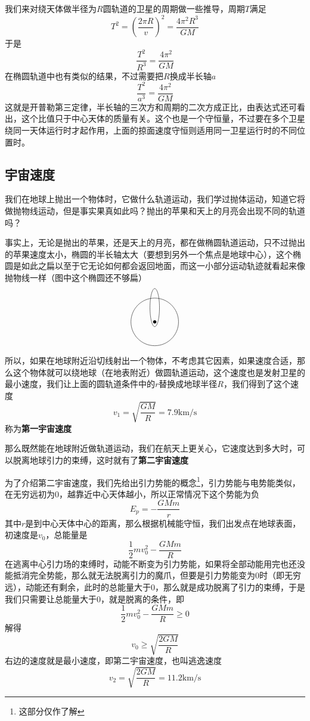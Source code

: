 \documentclass[hyperref,UTF8]{ctexart}
\begin{document}
我们来对绕天体做半径为$R$圆轨道的卫星的周期做一些推导，周期$T$满足
\[T^2 = (\frac{2\pi R}{v})^2=\frac{4\pi^2 R^3}{GM}\]
于是
\[\frac{T^2}{ R^3} = \frac{4\pi^2}{GM}\]
在椭圆轨道中也有类似的结果，不过需要把$R$换成半长轴$a$
\[\frac{T^2}{a^3} = \frac{4\pi^2}{GM}\]
这就是开普勒第三定律，半长轴的三次方和周期的二次方成正比，由表达式还可看出，这个比值只于中心天体的质量有关。这个也是一个守恒量，不过要在多个卫星绕同一天体运行时才起作用，上面的掠面速度守恒则适用同一卫星运行时的不同位置时。

\subsection{宇宙速度}
我们在地球上抛出一个物体时，它做什么轨道运动，我们学过抛体运动，知道它将做抛物线运动，但是事实果真如此吗？抛出的苹果和天上的月亮会出现不同的轨道吗？

事实上，无论是抛出的苹果，还是天上的月亮，都在做椭圆轨道运动，只不过抛出的苹果速度太小，椭圆的半长轴太大（要想到另外一个焦点是地球中心），这个椭圆是如此之扁以至于它无论如何都会返回地面，而这一小部分运动轨迹就看起来像抛物线一样（图中这个椭圆还不够扁）
\[
\begin{tikzpicture}
    \draw (0,0) circle (1cm);
    \draw (0,0.6) ellipse (0.2cm and 0.8cm);
    \fill (0,0) circle (2pt);
    \node[below left] (O) at (0,0) {};
\end{tikzpicture}
\]
所以，如果在地球附近沿切线射出一个物体，不考虑其它因素，如果速度合适，那么这个物体就可以绕地球（在地表附近）做圆轨道运动，这个速度也是发射卫星的最小速度，我们让上面的圆轨道条件中的$r$替换成地球半径$R$，我们得到了这个速度
\[v_1 = \sqrt{\frac{GM}{R}}=7.9 \mathrm{km}/\mathrm{s}\]
称为\textbf{第一宇宙速度}

那么既然能在地球附近做轨道运动，我们在航天上更关心，它速度达到多大时，可以脱离地球引力的束缚，这时就有了\textbf{第二宇宙速度}

为了介绍第二宇宙速度，我们先给出引力势能的概念\footnote{这部分仅作了解}，引力势能与电势能类似，在无穷远初为0，越靠近中心天体越小，所以正常情况下这个势能为负
\[E_p = -\frac{GMm}{r}\]
其中$r$是到中心天体中心的距离，那么根据机械能守恒，我们出发点在地球表面，初速度是$v_0$，总能量是
\[\frac12 mv^2_0-\frac{GMm}{R}\]
在逃离中心引力场的束缚时，动能不断变为引力势能，如果将全部动能用完也还没能抵消完全势能，那么就无法脱离引力的魔爪，但要是引力势能变为0时（即无穷远），动能还有剩余，此时的总能量大于0，那么就是成功脱离了引力的束缚，于是我们只需要让总能量大于0，就是脱离的条件，即
\[\frac12 mv^2_0-\frac{GMm}{R} \geqslant   0 \]
解得
\[v_0\geqslant \sqrt{\frac{2GM}{R}}\]
右边的速度就是最小速度，即第二宇宙速度，也叫逃逸速度
\[v_2 = \sqrt{\frac{2GM}{R}} = 11.2 \mathrm{km}/\mathrm{s}\]
\end{document}
